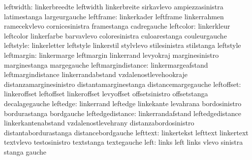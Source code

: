                 leftwidth: linkerbreedte             leftwidth
                           linkerbreite              sirkavlevo
                           ampiezzasinistra          latimestanga
                           largeurgauche
                leftframe: linkerkader               leftframe
                           linkerrahmen              ramecekvlevo
                           cornicesinistra           framestanga
                           cadregauche
                leftcolor: linkerkleur               leftcolor
                           linkerfarbe               barvavlevo
                           coloresinistra            culoarestanga
                           couleurgauche
                leftstyle: linkerletter              leftstyle
                           linkerstil                stylvlevo
                           stilesinistra             stilstanga
                           leftstyle
               leftmargin: linkermarge               leftmargin
                           linkerrand                levyokraj
                           marginesinistro           marginestanga
                           margegauche
       leftmargindistance: linkermargeafstand        leftmargindistance
                           linkerrandabstand         vzdalenostlevehookraje
                           distanzamarginesinistro   distantamarginestanga
                           distancemargegauche
               leftoffset: linkeroffset              leftoffset
                           linkeroffset              levyoffset
                           offsetsinistro            offsetstanga
                           decalagegauche
                 leftedge: linkerrand                leftedge
                           linkekante                levahrana
                           bordosinistro             bordurastanga
                           bordgauche
         leftedgedistance: linkerrandafstand         leftedgedistance
                           linkerkantenabstand       vzdalenostlevehrany
                           distanzabordosinistro     distantabordurastanga
                           distancebordgauche
                 lefttext: linkertekst               lefttext
                           linkertext                textvlevo
                           testosinistro             textstanga
                           textegauche
                     left: links                     left
                           links                     vlevo
                           sinistra                  stanga
                           gauche
